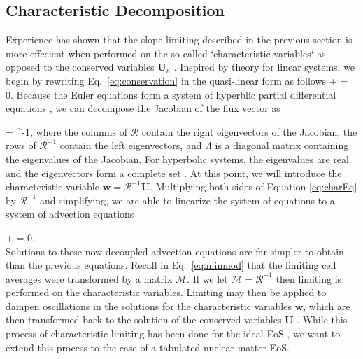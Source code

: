 \documentclass[onecolumn]{aastex62}
\begin{document}
\subsection{Characteristic Decomposition}
\label{sec:characteristicDecomp}
Experience has shown that the slope limiting described in the previous section
is more effecient when performed on the so-called `characteristic variables`
as opposed to the conserved variables $\mathbf{U}_h$
\citep[see, e.g.,][for a description]{cockburn:1998}.
Inspired by theory for linear systems, we begin by
rewriting Eq.~\eqref{eq:conservation} in the quasi-linear form as follows
\beq
  + 
  = 0.
  \label{eq:charEq}
\eeq
Because the Euler equations form a system of hyperblic
partial differential equations \citep[see, e.g.,][]{leveque:1992}, we can decompose the
Jacobian of the flux vector as

\beq
   =
   \Lambda {}^{-1},
\eeq
where the columns of $\mathcal{R}$ contain the right eigenvectors of the Jacobian,
the rows of $\mathcal{R}^{-1}$ contain the left eigenvectors, and
$\Lambda$ is a diagonal matrix containing the eigenvalues of the Jacobian.
For hyperbolic systems, the eigenvalues are real and the eigenvectors form a
complete set \citep[see e.g.,][]{leveque:1992}.
At this point, we will introduce the characteristic variable
$\mathbf{w} = \mathcal{R}^{-1}\mathbf{U}$. Multiplying both sides of Equation
\eqref{eq:charEq} by $\mathcal{R}^{-1}$ and simplifying, we are able to linearize the system of equations to
a system of advection equations

\beq
   +
  \Lambda {}
  = 0. \\
\eeq
Solutions to these now decoupled advection equations are far simpler to obtain than the
previous equations. Recall in Eq.~\eqref{eq:minmod} that the limiting cell
averages were transformed by a matrix $\mathcal{M}$. If we let
$\mathcal{M}=\mathcal{R}^{-1}$ then limiting is performed on the characteristic variables.
Limiting may then be applied to dampen oscillations in the
solutions for the characteristic variables $\mathbf{w}$, which are then
transformed back to the solution of the conserved variables $\mathbf{U}$
\citep[see e.g.,][for a description]{cockburn:1998, schaal:2015a}.
While this
process of characteristic limiting has been done for the ideal EoS
\citep[][]{cockburn:1998}, we want to extend this process to the case of a
tabulated nuclear matter EoS.
\end{document}

